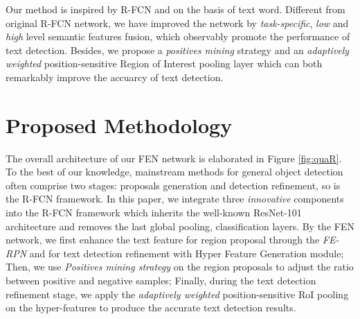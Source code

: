 \documentclass[letterpaper]{article}
\begin{document}
Our method is inspired by R-FCN \cite{dai2016r} and on the basis of text word. Different from original R-FCN network, we have improved the network by \textit{task-specific}, \textit{low} and \textit{high} level semantic features fusion, which observably promote the performance of text detection. Besides, we propose a \textit{positives mining} strategy and an \textit{adaptively weighted} position-sensitive Region of Interest pooling layer which can both remarkably improve the accuarcy of text detection.

\section{Proposed Methodology}
The overall architecture of our FEN network is elaborated in Figure \ref{fig:quaR}. To the best of our knowledge, mainstream methods for general object detection often comprise two stages: proposals generation and detection refinement, so is the R-FCN \cite{dai2016r} framework. In this paper, we integrate three \textit{innovative} components into the R-FCN framework which inherits the well-known ResNet-101 architecture \cite{he2016deep} and removes the last global pooling, classification layers. By the FEN network, we first enhance the text feature for region proposal through the \textit{FE-RPN} and for text detection refinement with Hyper Feature Generation module; Then, we use \textit{Positives mining strategy} on the region proposals to adjust the ratio between positive and negative samples; Finally, during the text detection refinement stage, we apply the \textit{adaptively weighted} position-sensitive RoI pooling on the hyper-features to produce the accurate text detection results.
\end{document}
